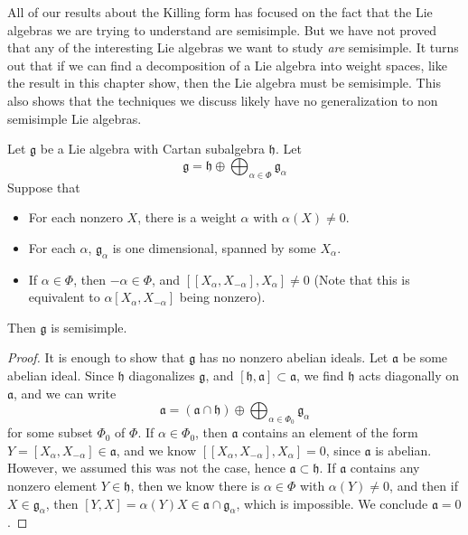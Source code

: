 All of our results about the Killing form has focused on the fact that the Lie algebras we are trying to understand are semisimple. But we have not proved that any of the interesting Lie algebras we want to study {\it are} semisimple. It turns out that if we can find a decomposition of a Lie algebra into weight spaces, like the result in this chapter show, then the Lie algebra must be semisimple. This also shows that the techniques we discuss likely have no generalization to non semisimple Lie algebras.

\begin{theorem}
    Let $\mathfrak{g}$ be a Lie algebra with Cartan subalgebra $\mathfrak{h}$. Let
    \[ \mathfrak{g} = \mathfrak{h} \oplus \bigoplus_{\alpha \in \Phi} \mathfrak{g}_\alpha \]
    Suppose that
    \begin{itemize}
        \item For each nonzero $X$, there is a weight $\alpha$ with $\alpha(X) \neq 0$.
        \item For each $\alpha$, $\mathfrak{g}_\alpha$ is one dimensional, spanned by some $X_\alpha$.
        \item If $\alpha \in \Phi$, then $-\alpha \in \Phi$, and $[[X_\alpha, X_{-\alpha}], X_\alpha] \neq 0$ (Note that this is equivalent to $\alpha[X_\alpha, X_{-\alpha}]$ being nonzero).
    \end{itemize}
    Then $\mathfrak{g}$ is semisimple.
\end{theorem}
\begin{proof}
    It is enough to show that $\mathfrak{g}$ has no nonzero abelian ideals. Let $\mathfrak{a}$ be some abelian ideal. Since $\mathfrak{h}$ diagonalizes $\mathfrak{g}$, and $[\mathfrak{h}, \mathfrak{a}] \subset \mathfrak{a}$, we find $\mathfrak{h}$ acts diagonally on $\mathfrak{a}$, and we can write
    \[ \mathfrak{a} = (\mathfrak{a} \cap \mathfrak{h}) \oplus \bigoplus_{\alpha \in \Phi_0} \mathfrak{g}_\alpha \]
    for some subset $\Phi_0$ of $\Phi$. If $\alpha \in \Phi_0$, then $\mathfrak{a}$ contains an element of the form $Y = [X_\alpha, X_{-\alpha}] \in \mathfrak{a}$, and we know $[[X_\alpha, X_{-\alpha}], X_\alpha] = 0$, since $\mathfrak{a}$ is abelian. However, we assumed this was not the case, hence $\mathfrak{a} \subset \mathfrak{h}$. If $\mathfrak{a}$ contains any nonzero element $Y \in \mathfrak{h}$, then we know there is $\alpha \in \Phi$ with $\alpha(Y) \neq 0$, and then if $X \in \mathfrak{g}_\alpha$, then $[Y,X] = \alpha(Y) X \in \mathfrak{a} \cap \mathfrak{g}_\alpha$, which is impossible. We conclude $\mathfrak{a} = 0$.
\end{proof}

